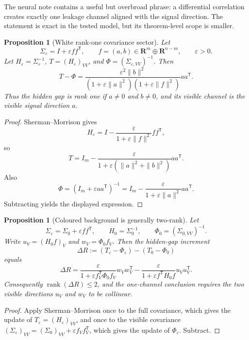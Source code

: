 \documentclass[11pt,a4paper]{article}
\numberwithin{equation}{section}
\DeclareMathOperator{\rank}{rank}
\newcommand{\R}{\mathbf R}
\theoremstyle{thmcompact}
\newtheorem{proposition}[theorem]{Proposition}
\theoremstyle{remark}
\begin{document}
The neural note contains a useful but overbroad phrase: a differential
correlation creates exactly one leakage channel aligned with the signal
direction. The statement is exact in the tested model, but its theorem-level
scope is smaller.

\begin{proposition}[White rank-one covariance sector]
Let
\[
  \Sigma_\varepsilon=I+\varepsilon ff^{\mathsf T},
  \qquad
  f=(a,b)\in\R^m\oplus\R^{n-m},
  \qquad
  \varepsilon>0.
\]
Let \(H_\varepsilon=\Sigma_\varepsilon^{-1}\), \(T=(H_\varepsilon)_{VV}\),
and \(\Phi=(\Sigma_{\varepsilon,VV})^{-1}\). Then
\[
  T-\Phi
  =
  \frac{\varepsilon^2\|b\|^2}
       {(1+\varepsilon\|a\|^2)(1+\varepsilon\|f\|^2)}
       aa^{\mathsf T}.
\]
Thus the hidden gap is rank one if \(a\ne0\) and \(b\ne0\), and its visible
channel is the visible signal direction \(a\).
\end{proposition}

\begin{proof}
Sherman--Morrison gives
\[
  H_\varepsilon
  =
  I-\frac{\varepsilon}{1+\varepsilon\|f\|^2}ff^{\mathsf T},
\]
so
\[
  T
  =
  I_m-\frac{\varepsilon}{1+\varepsilon(\|a\|^2+\|b\|^2)}aa^{\mathsf T}.
\]
Also
\[
  \Phi
  =
  (I_m+\varepsilon aa^{\mathsf T})^{-1}
  =
  I_m-\frac{\varepsilon}{1+\varepsilon\|a\|^2}aa^{\mathsf T}.
\]
Subtracting yields the displayed expression.
\end{proof}

\begin{proposition}[Coloured background is generally two-rank]
Let
\[
  \Sigma_\varepsilon=\Sigma_0+\varepsilon ff^{\mathsf T},
  \qquad H_0=\Sigma_0^{-1},
  \qquad \Phi_0=(\Sigma_{0,VV})^{-1}.
\]
Write \(u_V=(H_0f)_V\) and \(w_V=\Phi_0 f_V\). Then the hidden-gap increment
\[
  \Delta R:=(T_\varepsilon-\Phi_\varepsilon)-(T_0-\Phi_0)
\]
equals
\[
  \Delta R
  =
  \frac{\varepsilon}{1+\varepsilon f_V^{\mathsf T}\Phi_0f_V}w_Vw_V^{\mathsf T}
  -
  \frac{\varepsilon}{1+\varepsilon f^{\mathsf T}H_0f}u_Vu_V^{\mathsf T}.
\]
Consequently \(\rank(\Delta R)\le2\), and the one-channel conclusion requires
the two visible directions \(u_V\) and \(w_V\) to be collinear.
\end{proposition}

\begin{proof}
Apply Sherman--Morrison once to the full covariance, which gives the update of
\(T_\varepsilon=(H_\varepsilon)_{VV}\), and once to the visible covariance
\((\Sigma_\varepsilon)_{VV}=(\Sigma_0)_{VV}+\varepsilon f_Vf_V^{\mathsf T}\),
which gives the update of \(\Phi_\varepsilon\). Subtract.
\end{proof}
\end{document}
